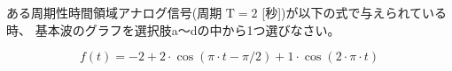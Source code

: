 ある周期性時間領域アナログ信号(周期 $\textrm{T} = 2$ [秒])が以下の式で与えられている時、
基本波のグラフを選択肢a〜dの中から1つ選びなさい。

\[
f(t) = 
-2
+ 2 \cdot \cos( \pi \cdot t - \pi/2)
+ 1 \cdot \cos( 2 \cdot \pi \cdot t )
\]
